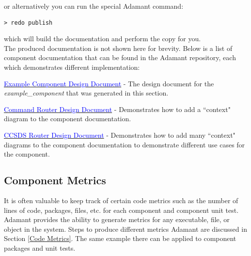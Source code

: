 or alternatively you can run the special Adamant command:

\vspace{5mm} %
\begin{verbatim}
> redo publish
\end{verbatim}
\vspace{5mm} %

which will build the documentation and perform the copy for you. \\

The produced documentation is not shown here for brevity. Below is a list of component documentation that can be found in the Adamant repository, each which demonstrates different implementation:

\vspace{5mm} %
\begin{spaceditemize}
  \item \href{https://github.com/lasp/adamant/blob/main/doc/example_architecture/example_component/doc/example_component.pdf}{\textcolor{blue}{Example Component Design Document}} - The design document for the \textit{example\_component} that was generated in this section.
  \item \href{https://github.com/lasp/adamant/blob/main/src/components/command_router/doc/command_router.pdf?at=refs%2Fheads%2Fdev}{\textcolor{blue}{Command Router Design Document}} - Demonstrates how to add a ``context" diagram to the component documentation.
  \item \href{https://github.com/lasp/adamant/blob/main/src/components/ccsds/ccsds_router/doc/ccsds_router.pdf?at=refs%2Fheads%2Fdev}{\textcolor{blue}{CCSDS Router Design Document}} - Demonstrates how to add many ``context" diagrams to the component documentation to demonstrate different use cases for the component.
\end{spaceditemize}
\vspace{5mm} %

\subsection{Component Metrics}

It is often valuable to keep track of certain code metrics such as the number of lines of code, packages, files, etc. for each component and component unit test. Adamant provides the ability to generate metrics for any executable, file, or object in the system. Steps to produce different metrics Adamant are discussed in Section \ref{Code Metrics}. The same example there can be applied to component packages and unit tests.

